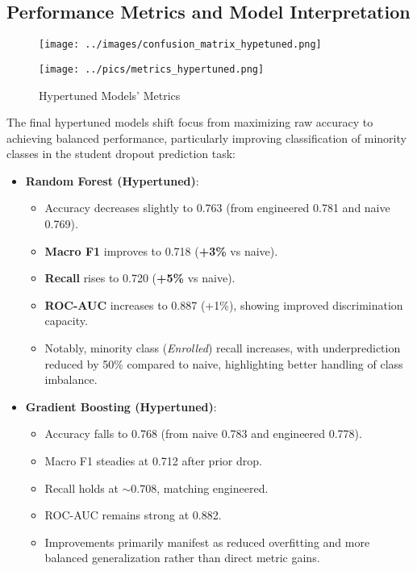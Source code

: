 \documentclass[twoside,final]{hcmut-report}
\begin{document}
\subsection{Performance Metrics and Model Interpretation}
\begin{figure}[H]
  \centering
  \texttt{[image: ../images/confusion\_matrix\_hypetuned.png]}
\end{figure}

\begin{figure}[H]
  \centering
  \texttt{[image: ../pics/metrics\_hypertuned.png]}
  \caption{Hypertuned Models' Metrics}
\end{figure}
The final hypertuned models shift focus from maximizing raw accuracy to achieving balanced performance, particularly improving classification of minority classes in the student dropout prediction task:
\begin{itemize}
  \item \textbf{Random Forest (Hypertuned)}:
        \begin{itemize}[parsep=0pt, itemsep=0pt, topsep=0pt]
          \item Accuracy decreases slightly to 0.763 (from engineered 0.781 and naive 0.769).
          \item \textbf{Macro F1} improves to 0.718 (\textbf{+3\%} vs naive).
          \item \textbf{Recall} rises to 0.720 (\textbf{+5\%} vs naive).
          \item \textbf{ROC-AUC} increases to 0.887 (+1\%), showing improved discrimination capacity.
          \item Notably, minority class (\textit{Enrolled}) recall increases, with underprediction reduced by 50\% compared to naive, highlighting better handling of class imbalance.
        \end{itemize}
  \item \textbf{Gradient Boosting (Hypertuned)}:
        \begin{itemize}[parsep=0pt, itemsep=0pt, topsep=0pt]
          \item Accuracy falls to 0.768 (from naive 0.783 and engineered 0.778).
          \item Macro F1 steadies at 0.712 after prior drop.
          \item Recall holds at $\sim$0.708, matching engineered.
          \item ROC-AUC remains strong at 0.882.
          \item Improvements primarily manifest as reduced overfitting and more balanced generalization rather than direct metric gains.
        \end{itemize}
\end{itemize}
\end{document}
